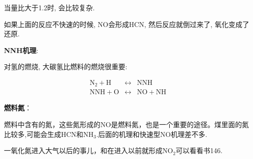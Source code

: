 当量比大于1.2时, 会比较复杂.

如果上面的反应不快速的时候, NO会形成HCN, 然后反应就倒过来了, 氧化变成了还原.

\textbf{NNH机理}: 

对氢的燃烧, 大碳氢比燃料的燃烧很重要:

\begin{eqnarray}
    \mathrm{N_2 + H} &\leftrightarrow& \mathrm{NNH}\\
    \mathrm{NNH + O} &\leftrightarrow& \mathrm{NO + NH}
\end{eqnarray}

\textbf{燃料氮}：

燃料中含有的氮，这些氮形成的NO是燃料氮，也是一个重要的途径。煤里面的氮比较多,可能会生成HCN和NH\(_3\).后面的机理和快速型NO机理差不多.

一氧化氮进入大气以后的事儿，和在进入以前就形成\(\mathrm{NO_2}\)可以看看书146.
